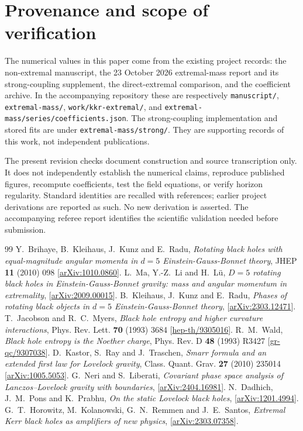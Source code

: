 \documentclass[11pt,a4paper]{article}
\begin{document}
\section{Provenance and scope of verification}
The numerical values in this paper come from the existing project records: the non-extremal manuscript, the 23 October 2026 extremal-mass report and its strong-coupling supplement, the direct-extremal comparison, and the coefficient archive. In the accompanying repository these are respectively \texttt{manuscript/}, \texttt{extremal-mass/}, \texttt{work/kkr-extremal/}, and \texttt{extremal-mass/series/coefficients.json}. The strong-coupling implementation and stored fits are under \texttt{extremal-mass/strong/}. They are supporting records of this work, not independent publications.

The present revision checks document construction and source transcription only. It does not independently establish the numerical claims, reproduce published figures, recompute coefficients, test the field equations, or verify horizon regularity. Standard identities are recalled with references; earlier project derivations are reported as such. No new derivation is asserted. The accompanying referee report identifies the scientific validation needed before submission.

\begin{thebibliography}{99}
 Y.~Brihaye, B.~Kleihaus, J.~Kunz and E.~Radu, \emph{Rotating black holes with equal-magnitude angular momenta in $d=5$ Einstein-Gauss-Bonnet theory}, JHEP \textbf{11} (2010) 098 [\href{https://arxiv.org/abs/1010.0860}{arXiv:1010.0860}].
 L.~Ma, Y.-Z.~Li and H.~L\"u, \emph{$D=5$ rotating black holes in Einstein-Gauss-Bonnet gravity: mass and angular momentum in extremality}, [\href{https://arxiv.org/abs/2009.00015}{arXiv:2009.00015}].
 B.~Kleihaus, J.~Kunz and E.~Radu, \emph{Phases of rotating black objects in $d=5$ Einstein-Gauss-Bonnet theory}, [\href{https://arxiv.org/abs/2303.12471}{arXiv:2303.12471}].
 T.~Jacobson and R.~C.~Myers, \emph{Black hole entropy and higher curvature interactions}, Phys. Rev. Lett. \textbf{70} (1993) 3684 [\href{https://arxiv.org/abs/hep-th/9305016}{hep-th/9305016}].
 R.~M.~Wald, \emph{Black hole entropy is the Noether charge}, Phys. Rev. D \textbf{48} (1993) R3427 [\href{https://arxiv.org/abs/gr-qc/9307038}{gr-qc/9307038}].
 D.~Kastor, S.~Ray and J.~Traschen, \emph{Smarr formula and an extended first law for Lovelock gravity}, Class. Quant. Grav. \textbf{27} (2010) 235014 [\href{https://arxiv.org/abs/1005.5053}{arXiv:1005.5053}].
 G.~Neri and S.~Liberati, \emph{Covariant phase space analysis of Lanczos--Lovelock gravity with boundaries}, [\href{https://arxiv.org/abs/2404.16981}{arXiv:2404.16981}].
 N.~Dadhich, J.~M.~Pons and K.~Prabhu, \emph{On the static Lovelock black holes}, [\href{https://arxiv.org/abs/1201.4994}{arXiv:1201.4994}].
 G.~T.~Horowitz, M.~Kolanowski, G.~N.~Remmen and J.~E.~Santos, \emph{Extremal Kerr black holes as amplifiers of new physics}, [\href{https://arxiv.org/abs/2303.07358}{arXiv:2303.07358}].
\end{thebibliography}
\end{document}
